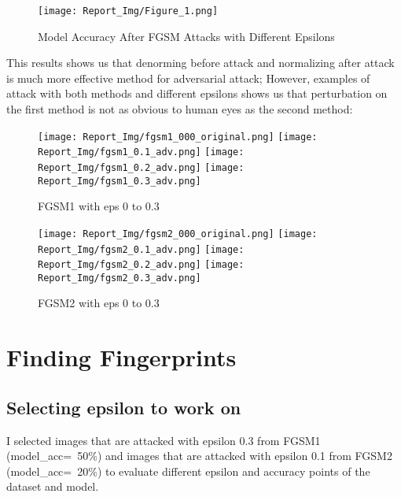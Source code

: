 \documentclass[a4paper,12pt]{report}
\begin{document}
\begin{figure}[H]
\centering
\texttt{[image: Report\_Img/Figure\_1.png]}
\caption{Model Accuracy After FGSM Attacks with Different Epsilons}
\end{figure}
This results shows us that denorming before attack and normalizing after attack is much more effective method for adversarial attack; However, examples of attack with both methods and different epsilons shows us that perturbation on the first method is not as obvious to human eyes as the second method:
\begin{figure}[!htb]
  \texttt{[image: Report\_Img/fgsm1\_000\_original.png]}
\endminipage\hfill
{}
  \texttt{[image: Report\_Img/fgsm1\_0.1\_adv.png]}
\endminipage\hfill
{}
  \texttt{[image: Report\_Img/fgsm1\_0.2\_adv.png]}
\endminipage\hfill
{}%
  \texttt{[image: Report\_Img/fgsm1\_0.3\_adv.png]}
\endminipage
  \caption{FGSM1 with eps 0 to 0.3}\label{fig:awesome_image1}
\end{figure}


\begin{figure}[!htb]
  \texttt{[image: Report\_Img/fgsm2\_000\_original.png]}
\endminipage\hfill
{}
  \texttt{[image: Report\_Img/fgsm2\_0.1\_adv.png]}
\endminipage\hfill
{}
  \texttt{[image: Report\_Img/fgsm2\_0.2\_adv.png]}
\endminipage\hfill
{}%
  \texttt{[image: Report\_Img/fgsm2\_0.3\_adv.png]}
\endminipage
  \caption{FGSM2 with eps 0 to 0.3}\label{fig:awesome_image1}
\end{figure}

\newpage
\chapter{Finding Fingerprints}
\section{Selecting epsilon to work on}
I selected images that are attacked with epsilon 0.3 from FGSM1 (model\_acc=~50\%) and images that are attacked with epsilon 0.1 from FGSM2 (model\_acc=~20\%)  to evaluate different epsilon and accuracy points of the dataset and model.
\end{document}
